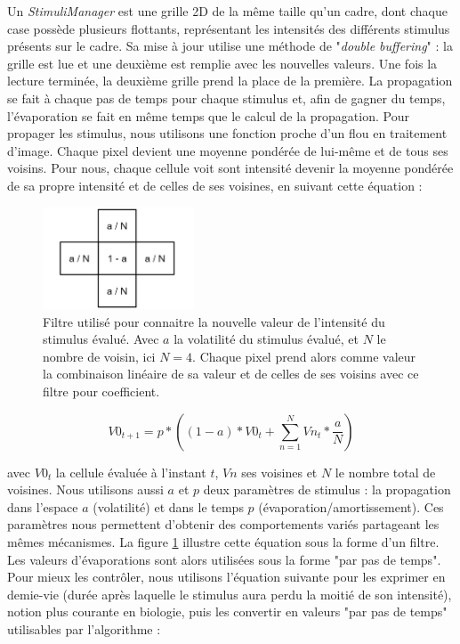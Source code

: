 			Un \textit{StimuliManager} est une grille 2D de la même taille qu'un cadre, dont chaque case possède plusieurs flottants, représentant les intensités des différents stimulus présents sur le cadre. Sa mise à jour utilise une méthode de "\textit{double buffering}" : la grille est lue et une deuxième est remplie avec les nouvelles valeurs. Une fois la lecture terminée, la deuxième grille prend la place de la première. La propagation se fait à chaque pas de temps pour chaque stimulus et, afin de gagner du temps, l'évaporation se fait en même temps que le calcul de la propagation. Pour propager les stimulus, nous utilisons une fonction proche d'un flou en traitement d'image. Chaque pixel devient une moyenne pondérée de lui-même et de tous ses voisins. Pour nous, chaque cellule voit sont intensité devenir la moyenne pondérée de sa propre intensité et de celles de ses voisines, en suivant cette équation :
			
			\begin{figure}
			\centering
			\includegraphics[width=0.4\textwidth]{./Pictures/Figures/flou.JPG}
			\caption[Filtre utilisé pour connaitre la nouvelle valeur de l'intensité du stimulus évalué.]{Filtre utilisé pour connaitre la nouvelle valeur de l'intensité du stimulus évalué. Avec $a$ la volatilité du stimulus évalué, et $N$ le nombre de voisin, ici $N=4$. Chaque pixel prend alors comme valeur la combinaison linéaire de sa valeur et de celles de ses voisins avec ce filtre pour coefficient.}
			\label{flou}
			\end{figure}
			
			\begin{equation}
			V0_{t+1} = p * ((1-a) * V0_t + \sum_{n=1}^{N} Vn_t * \frac{a}{N})
			\end{equation}
			
			avec $V0_t$ la cellule évaluée à l'instant $t$, $Vn$ ses voisines et $N$ le nombre total de voisines. Nous utilisons aussi $a$ et $p$ deux paramètres de stimulus : la propagation dans l'espace $a$ (volatilité) et dans le temps $p$ (évaporation/amortissement). Ces paramètres nous permettent d'obtenir des comportements variés partageant les mêmes mécanismes. La figure \ref{flou} illustre cette équation sous la forme d'un filtre. Les valeurs d'évaporations sont alors utilisées sous la forme "par pas de temps". Pour mieux les contrôler, nous utilisons l'équation suivante pour les exprimer en demie-vie (durée après laquelle le stimulus aura perdu la moitié de son intensité), notion plus courante en biologie, puis les convertir en valeurs "par pas de temps" utilisables par l'algorithme :
			
